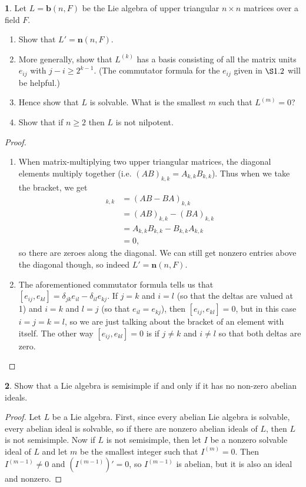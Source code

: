\documentclass[12pt]{article}
\theoremstyle{definition}
\newtheorem{ex}{}
\begin{document}
\begin{ex}
	Let $L = \mathbf{b}(n, F)$ be the Lie algebra of upper triangular $n \times n$ matrices over a field $F$.
	\begin{enumerate}[label=(\roman*)]
		\item Show that $L' = \mathbf{n}(n, F)$.
		\item More generally, show that $L^{(k)}$ has a basis consisting of all the matrix units $e_{ij}$ with $j - i \geq 2^{k-1}$.
		      (The commutator formula for the $e_{ij}$ given in $\S 1.2$ will be helpful.)
		\item Hence show that $L$ is solvable.
		      What is the smallest $m$ such that $L^{(m)} = 0$?
		\item Show that if $n \geq 2$ then $L$ is not nilpotent.
	\end{enumerate}
\end{ex}
\begin{proof}\
	\begin{enumerate}[label=(\roman*)]
		\item When matrix-multiplying two upper triangular matrices, the diagonal elements multiply together (i.e. $(AB)_{k,k} = A_{k, k}B_{k,k}$).
		      Thus when we take the bracket, we get \begin{align*}
			      [A, B]_{k,k} & = (AB - BA)_{k,k}                 \\
			                   & = (AB)_{k,k} - (BA)_{k,k}         \\
			                   & = A_{k,k}B_{k,k} - B_{k,k}A_{k,k} \\
			                   & = 0,
		      \end{align*}
		      so there are zeroes along the diagonal.
		      We can still get nonzero entries above the diagonal though, so indeed $L' = \mathbf{n}(n, F)$.
		\item The aforementioned commutator formula tells us that $[e_{ij}, e_{kl}] = \delta_{jk}e_{il} - \delta_{il}e_{kj}$.
		      If $j = k$ and $i = l$ (so that the deltas are valued at 1) and $i = k$ and $l = j$ (so that $e_{il} = e_{kj}$), then $[e_{ij}, e_{kl}] = 0$, but in this case $i = j = k = l$, so we are just talking about the bracket of an element with itself.
		      The other way $[e_{ij}, e_{kl}] = 0$ is if $j \neq k$ and $i \neq l$ so that both deltas are zero.
	\end{enumerate}
\end{proof}

\begin{ex}
	Show that a Lie algebra is semisimple if and only if it has no non-zero abelian ideals.
\end{ex}
\begin{proof}
	Let $L$ be a Lie algebra.
	First, since every abelian Lie algebra is solvable, every abelian ideal is solvable, so if there are nonzero abelian ideals of $L$, then $L$ is not semisimple.
	Now if $L$ is not semisimple, then let $I$ be a nonzero solvable ideal of $L$ and let $m$ be the smallest integer such that $I^{(m)} = 0$.
	Then $I^{(m-1)} \neq 0$ and $(I^{(m-1)})' = 0$, so $I^{(m-1)}$ is abelian, but it is also an ideal and nonzero.
\end{proof}
\end{document}
